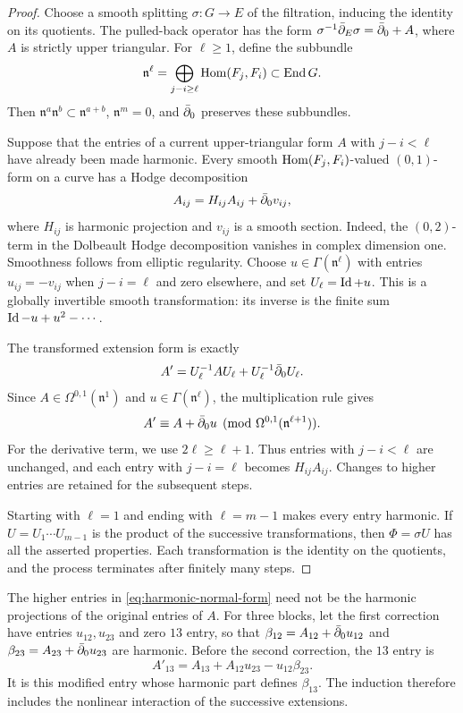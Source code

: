 \begin{proof}
Choose a smooth splitting $\sigma:G\to E$ of the filtration,
inducing the identity on its quotients. The pulled-back operator has
the form $\sigma^{-1}\bar\partial_E\sigma=\bar\partial_0+A$, where $A$ is strictly
upper triangular. For $\ell\ge1$, define the subbundle
\[
 \mathfrak n^\ell
 =\bigoplus_{j-i\ge\ell}\operatorname{Hom}(F_j,F_i)\subset\operatorname{End} G.
\]
Then $\mathfrak n^a\mathfrak n^b\subset\mathfrak n^{a+b}$,
$\mathfrak n^m=0$, and $\bar\partial_0$ preserves these subbundles.

Suppose that the entries of a current upper-triangular form $A$
with $j-i<\ell$ have already been made harmonic. Every smooth
$\operatorname{Hom}(F_j,F_i)$-valued $(0,1)$-form on a curve has a Hodge
decomposition
\begin{equation}\label{eq:curve-hodge}
 A_{ij}=H_{ij}A_{ij}+\bar\partial_0v_{ij},
\end{equation}
where $H_{ij}$ is harmonic projection and $v_{ij}$ is a smooth
section. Indeed, the $(0,2)$-term in the Dolbeault Hodge decomposition
vanishes in complex dimension one. Smoothness follows from elliptic
regularity. Choose $u\in\Gamma(\mathfrak n^\ell)$ with entries
$u_{ij}=-v_{ij}$ when $j-i=\ell$ and zero elsewhere, and set
$U_\ell=\operatorname{Id}+u$. This is a globally invertible smooth transformation:
its inverse is the finite sum $\operatorname{Id}-u+u^2-\cdots$.

The transformed extension form is exactly
\[
 A'=U_\ell^{-1}AU_\ell+U_\ell^{-1}\bar\partial_0U_\ell.
\]
Since $A\in\Omega^{0,1}(\mathfrak n^1)$ and
$u\in\Gamma(\mathfrak n^\ell)$, the multiplication rule gives
\begin{equation}\label{eq:triangular-gauge}
 A'\equiv A+\bar\partial_0u
 \pmod{\Omega^{0,1}(\mathfrak n^{\ell+1})}.
\end{equation}
For the derivative term, we use $2\ell\ge\ell+1$.
Thus entries with $j-i<\ell$ are unchanged, and each entry with
$j-i=\ell$ becomes $H_{ij}A_{ij}$. Changes to higher entries are
retained for the subsequent steps.

Starting with $\ell=1$ and ending with $\ell=m-1$ makes every
entry harmonic. If $U=U_1\cdots U_{m-1}$ is the product of the
successive transformations, then $\Phi=\sigma U$ has all the
asserted properties. Each transformation is the identity on the
quotients, and the process terminates after finitely many steps.
\end{proof}

The higher entries in \eqref{eq:harmonic-normal-form} need not be
the harmonic projections of the original entries of $A$. For three
blocks, let the first correction have entries $u_{12},u_{23}$ and
zero $13$ entry, so that
$\beta_{12}=A_{12}+\bar\partial_0u_{12}$ and
$\beta_{23}=A_{23}+\bar\partial_0u_{23}$ are harmonic. Before the second
correction, the $13$ entry is
\begin{equation}\label{eq:three-normal-form}
 A'_{13}=A_{13}+A_{12}u_{23}-u_{12}\beta_{23}.
\end{equation}
It is this modified entry whose harmonic part defines $\beta_{13}$.
The induction therefore includes the nonlinear interaction of the
successive extensions.

